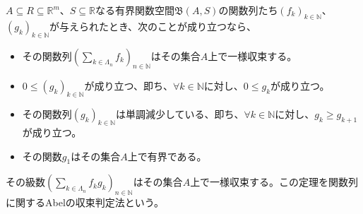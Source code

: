 \documentclass[dvipdfmx]{jsarticle}
\begin{document}
\begin{thm}[関数列に関するAbelの収束判定法]\label{4.1.11.21}
$A \subseteq R \subseteq \mathbb{R}^{m}$、$S \subseteq \mathbb{R}$なる有界関数空間$\mathfrak{B}(A,S)$の関数列たち$\left( f_{k} \right)_{k \in \mathbb{N}}$、$\left( g_{k} \right)_{k \in \mathbb{N}}$が与えられたとき、次のことが成り立つなら、
\begin{itemize}
\item
  その関数列$\left( \sum_{k \in \varLambda_{n}} f_{k} \right)_{n \in \mathbb{N}}$はその集合$A$上で一様収束する。
\item
  $0 \leq \left( g_{k} \right)_{k \in \mathbb{N}}$が成り立つ、即ち、$\forall k \in \mathbb{N}$に対し、$0 \leq g_{k}$が成り立つ。
\item
  その関数列$\left( g_{k} \right)_{k \in \mathbb{N}}$は単調減少している、即ち、$\forall k \in \mathbb{N}$に対し、$g_{k} \geq g_{k + 1}$が成り立つ。
\item
  その関数$g_{1}$はその集合$A$上で有界である。
\end{itemize}
その級数$\left( \sum_{k \in \varLambda_{n}} {f_{k}g_{k}} \right)_{n \in \mathbb{N}}$はその集合$A$上で一様収束する。この定理を関数列に関するAbelの収束判定法という。
\end{thm}
\end{document}
